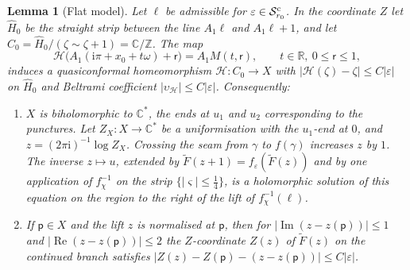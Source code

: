 \documentclass[11pt]{amsart}
\newtheorem{lemma}[theorem]{Lemma}
\theoremstyle{definition}
\newcommand{\ii}{\mathrm{i}}
\begin{document}
\begin{lemma}[Flat model]\label{lem:crescent-quotient}
Let $\ell$ be admissible for $\varepsilon\in\mathcal S^{\rm c}_{r_0}$.  In the coordinate $Z$ let
$\hat H_0$ be the straight strip between the line $A_1\ell$ and $A_1\ell+1$, and
let $C_0=\hat H_0/(\zeta\sim\zeta+1)=\mathbb C/\mathbb Z$.  The map
\[
 \mathcal H\bigl(A_1(\ii\pi+x_0+t\omega)+\mathsf r\bigr)=A_1M(t,\mathsf r),\qquad t\in\mathbb R,\ 0\le \mathsf r\le1,
\]
induces a quasiconformal homeomorphism $\mathcal H:C_0\to X$ with
$|\mathcal H(\zeta)-\zeta|\le C|\varepsilon|$ on $\hat H_0$ and Beltrami coefficient
$|\upsilon_{\mathcal H}|\le C|\varepsilon|$.  Consequently:
\begin{enumerate}
\item $X$ is biholomorphic to $\mathbb C^*$, the ends at $u_1$ and $u_2$
  corresponding to the punctures.  Let $Z_X:X\to\mathbb C^*$ be a uniformisation
  with the $u_1$-end at $0$, and $z=(2\pi\ii)^{-1}\log Z_X$.  Crossing the seam
  from $\gamma$ to $f(\gamma)$ increases $z$ by $1$.  The inverse $z\mapsto u$, extended
  by $\tilde F(z+1)=f_\varepsilon(\tilde F(z))$ and by one application of $f_\chi^{-1}$
  on the strip $\{|\varsigma|\le\tfrac14\}$, is a holomorphic solution of this
  equation on the region to the right of the lift of $f_\chi^{-1}(\ell)$.
\item If $\mathsf p\in X$ and the lift $z$ is normalised at $\mathsf p$, then for
  $|\operatorname{Im}(z-z(\mathsf p))|\le1$ and $|\operatorname{Re}(z-z(\mathsf p))|\le2$ the
  $Z$-coordinate $Z(z)$ of $\tilde F(z)$ on the continued branch satisfies
  $|Z(z)-Z(\mathsf p)-(z-z(\mathsf p))|\le C|\varepsilon|$.
\end{enumerate}
\end{lemma}
\end{document}
